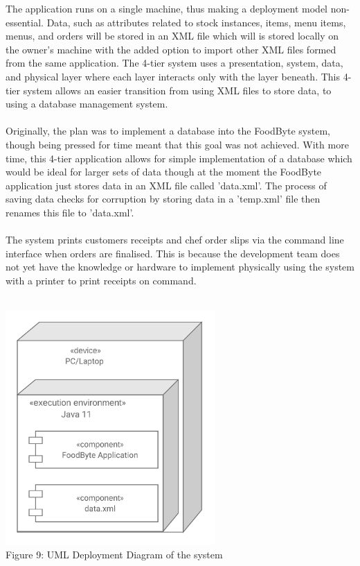 The application runs on a single machine, thus making a deployment model non-essential. Data, such as attributes related to stock instances, items, menu items, menus, and orders will be stored in an XML file which will is stored locally on the owner's machine with the added option to import other XML files formed from the same application. The 4-tier system uses a presentation, system, data, and physical layer where each layer interacts only with the layer beneath. This 4-tier system allows an easier transition from using XML files to store data, to using a database management system.
\\ \\
\noindent Originally, the plan was to implement a database into the FoodByte system, though being pressed for time meant that this goal was not achieved. With more time, this 4-tier application allows for simple implementation of a database which would be ideal for larger sets of data though at the moment the FoodByte application just stores data in an XML file called 'data.xml'. The process of saving data checks for corruption by storing data in a 'temp.xml' file then renames this file to 'data.xml'.
\\ \\ 
The system prints customers receipts and chef order slips via the command line interface when orders are finalised. This is because the development team does not yet have the knowledge or hardware to implement physically using the system with a printer to print receipts on command.
\\ \\
\begin{center}
	\includegraphics[width=8cm]{images/deployment_diagram.png}
	\\
	Figure 9: UML Deployment Diagram of the system	
\end{center}